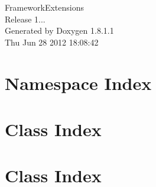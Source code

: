 \documentclass{book}
\begin{document}
\hypersetup{pageanchor=false,citecolor=blue}
\begin{titlepage}
\vspace*{7cm}
\begin{center}
{\Large Framework\-Extensions \\[1ex]\large Release 1... }\\
\vspace*{1cm}
{\large Generated by Doxygen 1.8.1.1}\\
\vspace*{0.5cm}
{\small Thu Jun 28 2012 18:08:42}\\
\end{center}
\end{titlepage}
\clearemptydoublepage
{}
\tableofcontents
\clearemptydoublepage
{}
\hypersetup{pageanchor=true,citecolor=blue}
\chapter{Namespace Index}

\chapter{Class Index}

\chapter{Class Index}

\end{document}
